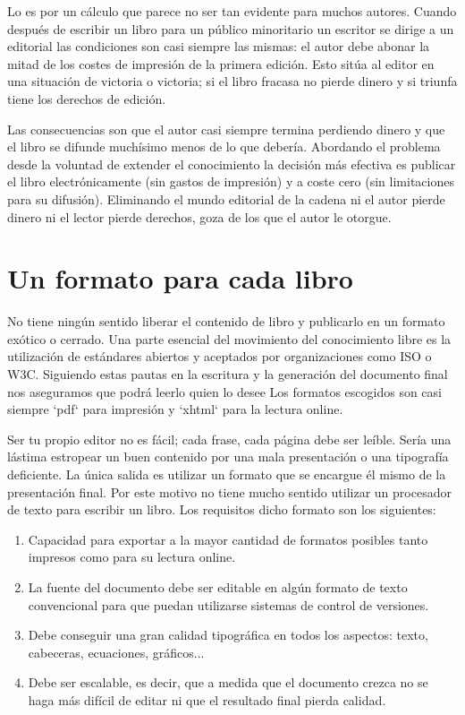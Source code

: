Lo es por un cálculo que parece no ser tan evidente para muchos
autores.  Cuando después de escribir un libro para un público
minoritario un escritor se dirige a un editorial las condiciones son
casi siempre las mismas: el autor debe abonar la mitad de los costes
de impresión de la primera edición. Esto sitúa al editor en una
situación de victoria o victoria; si el libro fracasa no pierde dinero
y si triunfa tiene los derechos de edición.
  
Las consecuencias son que el autor casi siempre termina perdiendo
dinero y que el libro se difunde muchísimo menos de lo que debería.
Abordando el problema desde la voluntad de extender el conocimiento la
decisión más efectiva es publicar el libro electrónicamente (sin
gastos de impresión) y a coste cero (sin limitaciones para su
difusión).  Eliminando el mundo editorial de la cadena ni el autor
pierde dinero ni el lector pierde derechos, goza de los que el autor
le otorgue.

  
\section*{Un formato para cada libro}
  
No tiene ningún sentido liberar el contenido de libro y publicarlo en
un formato exótico o cerrado.  Una parte esencial del movimiento del
conocimiento libre es la utilización de estándares abiertos y
aceptados por organizaciones como ISO o W3C. Siguiendo estas pautas en
la escritura y la generación del documento final nos aseguramos que
podrá leerlo quien lo desee Los formatos escogidos son casi siempre
`pdf` para impresión y `xhtml` para la lectura online.
  
Ser tu propio editor no es fácil; cada frase, cada página debe ser
leíble.  Sería una lástima estropear un buen contenido por una mala
presentación o una tipografía deficiente.  La única salida es utilizar
un formato que se encargue él mismo de la presentación final.  Por
este motivo no tiene mucho sentido utilizar un procesador de texto
para escribir un libro.  Los requisitos dicho formato son los
siguientes:

\begin{enumerate}      
\item Capacidad para exportar a la mayor cantidad de formatos posibles
   tanto impresos como para su lectura online.
      
\item La fuente del documento debe ser editable en algún formato de
   texto convencional para que puedan utilizarse sistemas de control
   de versiones.
      
\item Debe conseguir una gran calidad tipográfica en todos los aspectos:
   texto, cabeceras, ecuaciones, gráficos...
      
\item Debe ser escalable, es decir, que a medida que el documento crezca
   no se haga más difícil de editar ni que el resultado final pierda
   calidad.
\end{enumerate}

